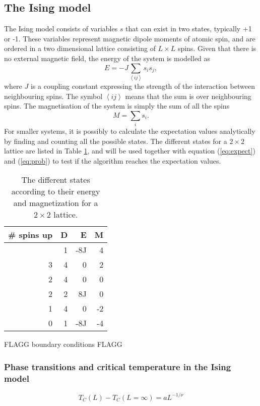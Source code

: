\subsection{The Ising model}
The Ising model consists of variables $s$ that can exist in two states, typically +1 or -1. These variables represent magnetic dipole moments of atomic spin, and are ordered in a two dimensional lattice consisting of $L\times L$ spins. Given that there is no external magnetic field, the energy of the system is modelled as
\begin{equation}
E = -J\sum_{\left\langle ij\right\rangle } s_is_j,
\end{equation} 
where $J$ is a coupling constant expressing the strength of the interaction between neighbouring spins. The symbol $\left\langle ij\right\rangle$ means that the sum is over neighbouring spins. The magnetisation of the system is simply the sum of all the spins 
\begin{equation}
M = \sum_i s_i.
\end{equation}
For smaller systems, it is possibly to calculate the expectation values analytically by finding and counting all the possible states. The different states for a $2\times 2$ lattice are listed in Table \ref{tab:L2 values}, and will be used together with equation (\ref{eq:expect}) and (\ref{eq:prob}) to test if the algorithm reaches the expectation values.
\begin{table}[htbp]
	\centering
	\begin{tabular}{rrrr}
		\# spins up & D & E & M \\
		\hline
		\addlinespace[0.1cm]
		4                   & 1          & -8J    & 4             \\
		3                   & 4          & 0      & 2             \\
		2                   & 4          & 0      & 0             \\
		2                   & 2          & 8J     & 0             \\
		1                   & 4          & 0      & -2            \\
		0                   & 1          & -8J    & -4           
	\end{tabular}
	\caption{The different states according to their energy and magnetization for a $2\times 2$ lattice.}
	\label{tab:L2 values}
\end{table}

FLAGG boundary conditions FLAGG 

\subsubsection{Phase transitions and critical temperature in the Ising model}
\begin{equation}
T_C(L) - T_C(L=\infty) = aL^{-1/\nu}
\end{equation}

